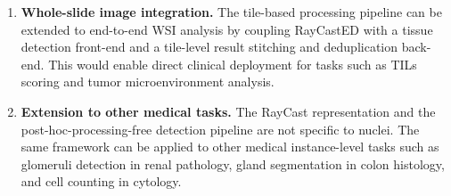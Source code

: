 \begin{enumerate}
	      footprint on edge devices. Quantization-aware training or calibration-based post-training quantization should be
	      evaluated for impact on detection and segmentation accuracy.
	\item \textbf{Whole-slide image integration.} The tile-based processing pipeline can be extended to end-to-end WSI
	      analysis by coupling RayCastED with a tissue detection front-end and a tile-level result stitching and
	      deduplication back-end. This would enable direct clinical deployment for tasks such as TILs scoring and tumor
	      microenvironment analysis.
	\item \textbf{Extension to other medical tasks.} The RayCast representation and the post-hoc-processing-free detection
	      pipeline are not specific to nuclei. The same framework can be applied to other medical instance-level tasks such
	      as glomeruli detection in renal pathology, gland segmentation in colon histology, and cell counting in
	      cytology.
\end{enumerate}
